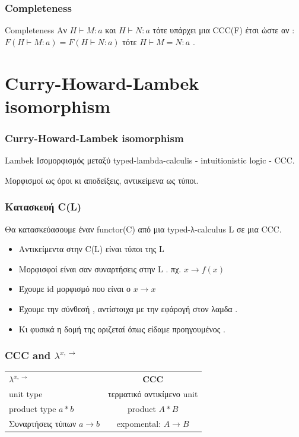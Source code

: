 \documentclass[hyperref={pdfpagelabels=false}]{beamer}
\begin{document}
\begin{frame}
	\frametitle{Completeness}
	\begin{block}{Completeness}
		Αν  $H \vdash M:a$ και $H \vdash N:a $ τότε υπάρχει μια CCC(F) έτσι ώστε αν :  $F(H \vdash M:a)=F(H \vdash N:a)$ τότε $H \vdash M = N :a$ .
	\end{block}
\end{frame}


\section{Curry-Howard-Lambek isomorphism}


\begin{frame}
\frametitle{Curry-Howard-Lambek isomorphism}
\begin{block}{Lambek}
Ισομορφισμός μεταξύ typed-lambda-calculis - intuitionistic logic - CCC.
\end{block}
Μορφισμοί ως όροι κι αποδείξεις, αντικείμενα ως τύποι.
\end{frame}
\begin{frame}
	\frametitle{Κατασκευή C(L)}
Θα κατασκεύασουμε έναν functor(C) από μια typed-λ-calculus L σε μια CCC.
\begin{itemize}
\item {Αντικείμεντα στην C(L) είναι τύποι της L}
\item {Μορφισφοί είναι σαν συναρτήσεις στην L . πχ. $x \rightarrow f(x)$ }
\item {Έχουμε id μορφισμό που είναι ο  $x \rightarrow x$}
\item {Έχουμε την σύνθεσή , αντίστοιχα με την εφάρογή στον λαμδα .}
\item { Κι φυσικά η δομή της  οριζεταί όπως είδαμε προηγουμένος . }

\end{itemize}
\end{frame}

\begin{frame}
	\frametitle {CCC and $\lambda^{x,\rightarrow}$}
	\begin{tabular}{l   c}
		\textbf{$\lambda^{x,\rightarrow}$} & \textbf{CCC}\\
		unit type & τερματικό αντικίμενο unit
		\\ product type $a*b$ & product $A*B$
		\\ Συναρτήσεις τύπων $a\rightarrow b$ & expomental: $A \rightarrow B$ 
	\end{tabular}
\end{frame}
\end{document}
